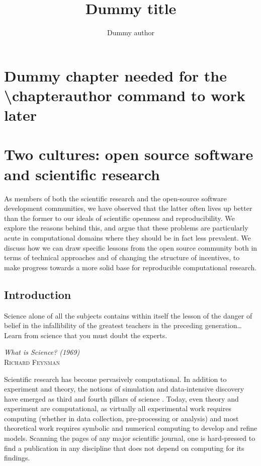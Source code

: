 \documentclass[ChapterTOCs,krantz2]{krantz} %
\begin{document}
\title{Dummy title}
\author{Dummy author}
\chapter*{Dummy chapter needed for the \textbackslash chapterauthor command to work later}

\mainmatter



\chapter{Two cultures: open source software and scientific research}

As members of both the scientific research and the open-source
software development communities, we have observed that the latter
often lives up better than the former to our ideals of scientific
openness and reproducibility.  We explore the reasons behind this,
and argue that these problems are particularly acute in computational
domains where they should be in fact less prevalent.   We discuss
how we can draw specific lessons from the open source community both
in terms of technical approaches and of changing the structure of
incentives, to make progress towards a more solid base for reproducible
computational research.

\section{Introduction}\label{intro}

\setlength{\epigraphrule}{0pt}
\setlength{\epigraphwidth}{.65\textwidth}
\epigraph%
{%
  Science alone of all the subjects contains within itself the lesson of the
  danger of belief in the infallibility of the greatest teachers in the
  preceding generation\ldots Learn from science that you must doubt the experts.
}%
{\textit{What is Science? (1969)}\\ \textsc{Richard Feynman} }

Scientific research has become pervasively computational. In addition
to experiment and theory, the notions of simulation and data-intensive
discovery have emerged as third and fourth pillars of science \cite{4th-paradigm}.
Today, even theory and experiment are computational, as virtually
all experimental work requires computing (whether in data collection,
pre-processing or analysis) and most theoretical work requires symbolic
and numerical computing to develop and refine models. Scanning the pages
of any major scientific journal, one is hard-pressed to find a publication
in any discipline that does not depend on computing for its findings.
\end{document}

